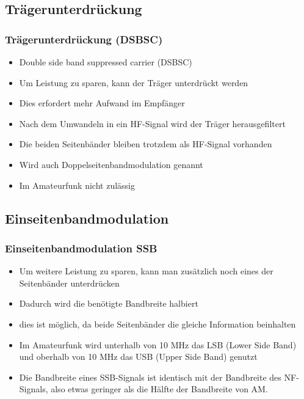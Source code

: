 \subsection[DSBSC]{Trägerunterdrückung}
\begin{frame}
\frametitle{Trägerunterdrückung (DSBSC)}
\begin{itemize}
  \item Double side band suppressed carrier (DSBSC)
  \item Um Leistung zu sparen, kann der Träger unterdrückt werden
  \item Dies erfordert mehr Aufwand im Empfänger
  \item Nach dem Umwandeln in ein HF-Signal wird der Träger herausgefiltert
  \item Die beiden Seitenbänder bleiben trotzdem als HF-Signal vorhanden
  \item Wird auch Doppelseitenbandmodulation genannt
  \item Im Amateurfunk nicht zulässig
\end{itemize}
\end{frame}

\subsection[SSB]{Einseitenbandmodulation}
\begin{frame}
\frametitle{Einseitenbandmodulation SSB}
\begin{small}
\begin{itemize}
  \item Um weitere Leistung zu sparen, kann man zusätzlich noch eines der Seitenbänder unterdrücken
  \item Dadurch wird die benötigte Bandbreite halbiert
  \item dies ist möglich, da beide Seitenbänder die gleiche Information beinhalten
  \item Im Amateurfunk wird unterhalb von 10 MHz das LSB (Lower Side Band) und oberhalb von 10 MHz das USB (Upper Side Band) genutzt	
  \item Die Bandbreite eines SSB-Signals ist identisch mit der Bandbreite des NF-Signals, also etwas geringer als die Hälfte der Bandbreite von AM.
\end{itemize}
\end{small}
\end{frame}

